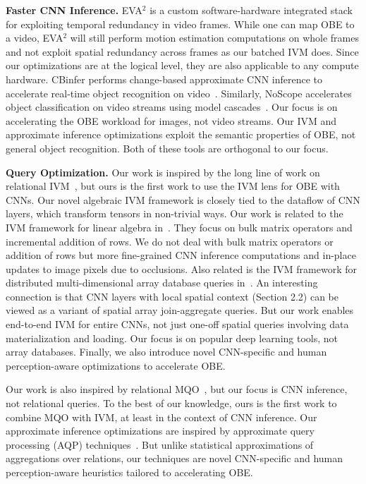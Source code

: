 \documentclass[10pt, sigconf]{acmart}
\begin{document}
\vspace{2mm}
\noindent \textbf{Faster CNN Inference.} 
EVA$^2$ \cite{buckler2018eva} is a custom software-hardware integrated stack for exploiting temporal redundancy in video frames. While one can map OBE to a video, EVA$^2$ will still perform motion estimation computations on whole frames and not exploit spatial redundancy across frames as our batched IVM does. Since our optimizations are at the logical level, they are also applicable to any compute hardware.
CBinfer performs change-based approximate CNN inference to accelerate real-time object recognition on video~\cite{cavigelli2017cbinfer}. Similarly, NoScope accelerates object classification on video streams using model cascades~\cite{kang2017noscope}. Our focus is on accelerating the OBE workload for images, not video streams. Our IVM and approximate inference optimizations exploit the semantic properties of OBE, not general object recognition. Both of these tools are orthogonal to our focus.


\vspace{2mm}
\noindent \textbf{Query Optimization.}
Our work is inspired by the long line of work on relational IVM~\cite{chirkova2012materialized, gupta1995maintenance, levy1995answering}, but ours is the first work to use the IVM lens for OBE with CNNs. Our novel algebraic IVM framework is closely tied to the dataflow of CNN layers, which transform tensors in non-trivial ways. Our work is related to the IVM framework for linear algebra in~\cite{nikolic2014linview}. They focus on bulk matrix operators and incremental addition of rows. We do not deal with bulk matrix operators or addition of rows but more fine-grained CNN inference computations and in-place updates to image pixels due to occlusions. Also related is the IVM framework for distributed multi-dimensional array database queries in~\cite{zhao2017incremental}. An interesting connection is that CNN layers with local spatial context (Section 2.2) can be viewed as a variant of spatial array join-aggregate queries. But our work enables end-to-end IVM for entire CNNs, not just one-off spatial queries involving data materialization and loading. Our focus is on popular deep learning tools, not array databases. Finally, we also introduce novel CNN-specific and human perception-aware optimizations to accelerate OBE.

Our work is also inspired by relational MQO~\cite{sellis1988multiple,le2012scalable}, but our focus is CNN inference, not relational queries. To the best of our knowledge, ours is the first work to combine MQO with IVM, at least in the context of CNN inference. Our approximate inference optimizations are inspired by approximate query processing (AQP) techniques~\cite{garofalakis2001approximate}. But unlike statistical approximations of aggregations over relations, our techniques are novel CNN-specific and human perception-aware heuristics tailored to accelerating OBE.
\end{document}
